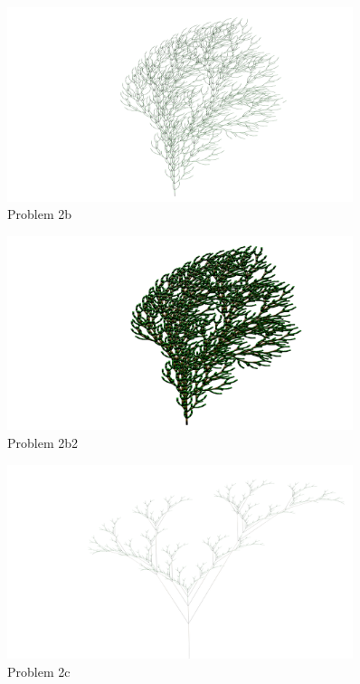 \begin{figure}[H]
\centering
\noindent\includegraphics[width=0.90\textwidth]{figures/L-systems/b}
\caption{Problem 2b}
\label{fig:prob2b}
\end{figure}

\begin{figure}[H]
\centering
\noindent\includegraphics[width=0.90\textwidth]{figures/L-systems/b2}
\caption{Problem 2b2}
\label{fig:prob2b2}
\end{figure}

\begin{figure}[H]
\centering
\noindent\includegraphics[width=0.90\textwidth]{figures/L-systems/c}
\caption{Problem 2c}
\label{fig:prob2c}
\end{figure}

